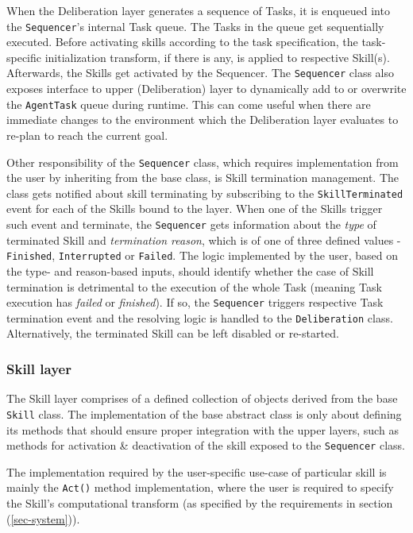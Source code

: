 \documentclass[main.tex]{subfiles}
\begin{document}
When the Deliberation layer generates a sequence of Tasks, it is enqueued into the
\texttt{Sequencer}'s internal Task queue. The Tasks in the queue get sequentially executed. 
Before activating skills according to the task specification, the task-specific 
initialization transform, if there is any, is applied to respective Skill(s). Afterwards, 
the Skills get activated by the Sequencer. The \texttt{Sequencer} class also exposes interface 
to upper (Deliberation) layer to dynamically add to or overwrite the \texttt{AgentTask} queue 
during runtime. This can come useful when there are immediate changes to the environment which 
the Deliberation layer evaluates to re-plan to reach the current goal. 

Other responsibility of the \texttt{Sequencer} class, which requires implementation from the 
user by inheriting from the base class, is Skill termination management. The class gets notified about skill terminating
by subscribing to the \texttt{SkillTerminated} event for each of the Skills bound to the layer.
When one of the Skills trigger such event and terminate, the \texttt{Sequencer} gets information 
about the \emph{type} of terminated Skill and \emph{termination reason}, which is of one of 
three defined values - \texttt{Finished}, \texttt{Interrupted} or \texttt{Failed}. The logic 
implemented by the user, based on the type- and reason-based inputs, should identify whether 
the case of Skill termination is detrimental to the execution of the whole Task (meaning 
Task execution has \emph{failed} or \emph{finished}). If so, the \texttt{Sequencer} triggers
respective Task termination event and the resolving logic is handled to the \texttt{Deliberation}
class. Alternatively, the terminated Skill can be left disabled or re-started. 

\subsubsection{Skill layer}

The Skill layer comprises of a defined collection of objects derived from the base
\texttt{Skill} class. The implementation of the base abstract class is only about 
defining its methods that should ensure proper integration with the upper layers, such 
as methods for activation \& deactivation of the skill exposed to the \texttt{Sequencer}
class.

The implementation required by the user-specific use-case of particular skill is mainly 
the \texttt{Act()} method implementation, where the user is required to specify the Skill's
computational transform (as specified by the requirements in section (\ref{sec-system})).
\end{document}

